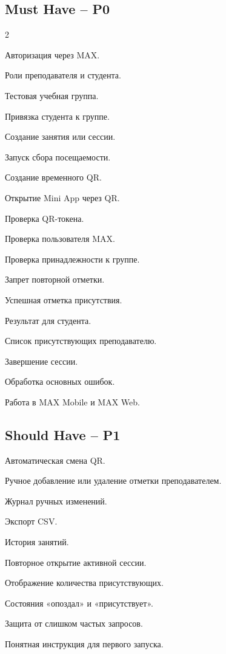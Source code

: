 \documentclass[11pt,a4paper]{article}
\newcommand{\PZero}{\textcolor{PZero}{\textbf{P0}}}
\newcommand{\POne}{\textcolor{POne}{\textbf{P1}}}
\begin{document}
\subsection{Must Have -- \PZero}
\begin{multicols}{2}
\begin{tasklist}
  \item Авторизация через MAX.
  \item Роли преподавателя и студента.
  \item Тестовая учебная группа.
  \item Привязка студента к группе.
  \item Создание занятия или сессии.
  \item Запуск сбора посещаемости.
  \item Создание временного QR.
  \item Открытие Mini App через QR.
  \item Проверка QR-токена.
  \item Проверка пользователя MAX.
  \item Проверка принадлежности к группе.
  \item Запрет повторной отметки.
  \item Успешная отметка присутствия.
  \item Результат для студента.
  \item Список присутствующих преподавателю.
  \item Завершение сессии.
  \item Обработка основных ошибок.
  \item Работа в MAX Mobile и MAX Web.
\end{tasklist}
\end{multicols}

\subsection{Should Have -- \POne}
\begin{tasklist}
  \item Автоматическая смена QR.
  \item Ручное добавление или удаление отметки преподавателем.
  \item Журнал ручных изменений.
  \item Экспорт CSV.
  \item История занятий.
  \item Повторное открытие активной сессии.
  \item Отображение количества присутствующих.
  \item Состояния «опоздал» и «присутствует».
  \item Защита от слишком частых запросов.
  \item Понятная инструкция для первого запуска.
\end{tasklist}
\end{document}
